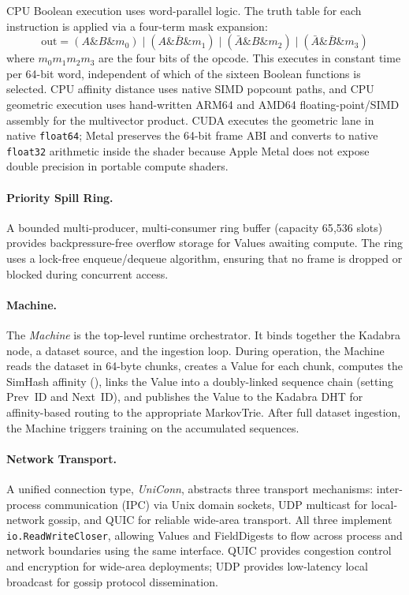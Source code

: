 CPU Boolean execution uses word-parallel logic.  The truth table for
each instruction is applied via a four-term mask expansion:
\begin{equation}
  \text{out} = (A \mathbin{\&} B \mathbin{\&} m_0)
             \mathbin{|} (A \mathbin{\&} \bar{B} \mathbin{\&} m_1)
             \mathbin{|} (\bar{A} \mathbin{\&} B \mathbin{\&} m_2)
             \mathbin{|} (\bar{A} \mathbin{\&} \bar{B} \mathbin{\&} m_3)
  \label{eq:truth_table_expansion}
\end{equation}
where $m_0 m_1 m_2 m_3$ are the four bits of the opcode.  This executes
in constant time per 64-bit word, independent of which of the sixteen
Boolean functions is selected.  CPU affinity distance uses native SIMD
popcount paths, and CPU geometric execution uses hand-written ARM64 and
AMD64 floating-point/SIMD assembly for the multivector product.  CUDA
executes the geometric lane in native \texttt{float64}; Metal preserves
the 64-bit frame ABI and converts to native \texttt{float32} arithmetic
inside the shader because Apple Metal does not expose double precision
in portable compute shaders.

\paragraph{Priority Spill Ring.}
A bounded multi-producer, multi-consumer ring buffer (capacity 65{,}536
slots) provides backpressure-free overflow storage for Values awaiting
compute.  The ring uses a lock-free enqueue/dequeue algorithm, ensuring
that no frame is dropped or blocked during concurrent access.

\paragraph{Machine.}
The \emph{Machine} is the top-level runtime orchestrator.  It binds
together the Kadabra node, a dataset source, and the ingestion loop.
During operation, the Machine reads the dataset in 64-byte chunks,
creates a Value for each chunk, computes the SimHash affinity
(), links the Value into a doubly-linked sequence
chain (setting Prev~ID and Next~ID), and publishes the Value to the
Kadabra DHT for affinity-based routing to the appropriate MarkovTrie.
After full dataset ingestion, the Machine triggers training on the
accumulated sequences.

\paragraph{Network Transport.}
A unified connection type, \emph{UniConn}, abstracts three transport
mechanisms: inter-process communication (IPC) via Unix domain sockets,
UDP multicast for local-network gossip, and QUIC for reliable wide-area
transport.  All three implement \texttt{io.ReadWriteCloser}, allowing
Values and FieldDigests to flow across process and network boundaries
using the same interface.  QUIC provides congestion control and
encryption for wide-area deployments; UDP provides low-latency local
broadcast for gossip protocol dissemination.
